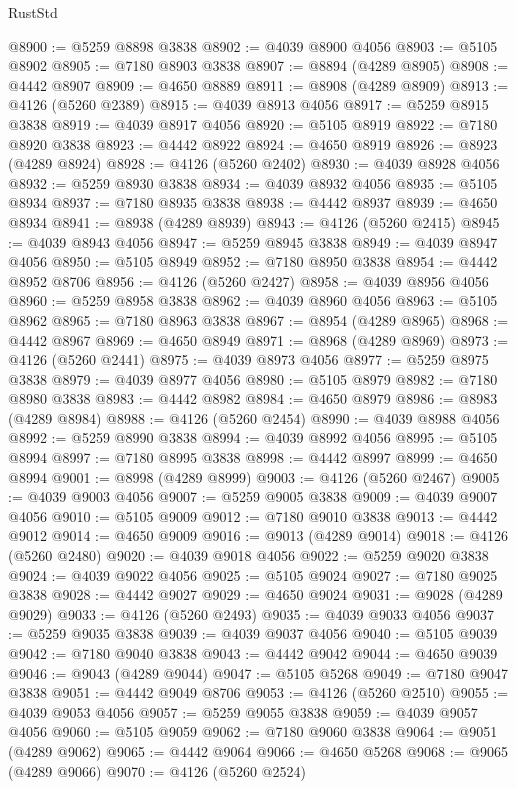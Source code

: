 \begin{lexlean}{RustStd}
\begin{coremodule}
@8900 := @5259 @8898 @3838
@8902 := @4039 @8900 @4056
@8903 := @5105 @8902
@8905 := @7180 @8903 @3838
@8907 := @8894 (@4289 @8905)
@8908 := @4442 @8907
@8909 := @4650 @8889
@8911 := @8908 (@4289 @8909)
@8913 := @4126 (@5260 @2389)
@8915 := @4039 @8913 @4056
@8917 := @5259 @8915 @3838
@8919 := @4039 @8917 @4056
@8920 := @5105 @8919
@8922 := @7180 @8920 @3838
@8923 := @4442 @8922
@8924 := @4650 @8919
@8926 := @8923 (@4289 @8924)
@8928 := @4126 (@5260 @2402)
@8930 := @4039 @8928 @4056
@8932 := @5259 @8930 @3838
@8934 := @4039 @8932 @4056
@8935 := @5105 @8934
@8937 := @7180 @8935 @3838
@8938 := @4442 @8937
@8939 := @4650 @8934
@8941 := @8938 (@4289 @8939)
@8943 := @4126 (@5260 @2415)
@8945 := @4039 @8943 @4056
@8947 := @5259 @8945 @3838
@8949 := @4039 @8947 @4056
@8950 := @5105 @8949
@8952 := @7180 @8950 @3838
@8954 := @4442 @8952 @8706
@8956 := @4126 (@5260 @2427)
@8958 := @4039 @8956 @4056
@8960 := @5259 @8958 @3838
@8962 := @4039 @8960 @4056
@8963 := @5105 @8962
@8965 := @7180 @8963 @3838
@8967 := @8954 (@4289 @8965)
@8968 := @4442 @8967
@8969 := @4650 @8949
@8971 := @8968 (@4289 @8969)
@8973 := @4126 (@5260 @2441)
@8975 := @4039 @8973 @4056
@8977 := @5259 @8975 @3838
@8979 := @4039 @8977 @4056
@8980 := @5105 @8979
@8982 := @7180 @8980 @3838
@8983 := @4442 @8982
@8984 := @4650 @8979
@8986 := @8983 (@4289 @8984)
@8988 := @4126 (@5260 @2454)
@8990 := @4039 @8988 @4056
@8992 := @5259 @8990 @3838
@8994 := @4039 @8992 @4056
@8995 := @5105 @8994
@8997 := @7180 @8995 @3838
@8998 := @4442 @8997
@8999 := @4650 @8994
@9001 := @8998 (@4289 @8999)
@9003 := @4126 (@5260 @2467)
@9005 := @4039 @9003 @4056
@9007 := @5259 @9005 @3838
@9009 := @4039 @9007 @4056
@9010 := @5105 @9009
@9012 := @7180 @9010 @3838
@9013 := @4442 @9012
@9014 := @4650 @9009
@9016 := @9013 (@4289 @9014)
@9018 := @4126 (@5260 @2480)
@9020 := @4039 @9018 @4056
@9022 := @5259 @9020 @3838
@9024 := @4039 @9022 @4056
@9025 := @5105 @9024
@9027 := @7180 @9025 @3838
@9028 := @4442 @9027
@9029 := @4650 @9024
@9031 := @9028 (@4289 @9029)
@9033 := @4126 (@5260 @2493)
@9035 := @4039 @9033 @4056
@9037 := @5259 @9035 @3838
@9039 := @4039 @9037 @4056
@9040 := @5105 @9039
@9042 := @7180 @9040 @3838
@9043 := @4442 @9042
@9044 := @4650 @9039
@9046 := @9043 (@4289 @9044)
@9047 := @5105 @5268
@9049 := @7180 @9047 @3838
@9051 := @4442 @9049 @8706
@9053 := @4126 (@5260 @2510)
@9055 := @4039 @9053 @4056
@9057 := @5259 @9055 @3838
@9059 := @4039 @9057 @4056
@9060 := @5105 @9059
@9062 := @7180 @9060 @3838
@9064 := @9051 (@4289 @9062)
@9065 := @4442 @9064
@9066 := @4650 @5268
@9068 := @9065 (@4289 @9066)
@9070 := @4126 (@5260 @2524)

\end{coremodule}
\end{lexlean}
